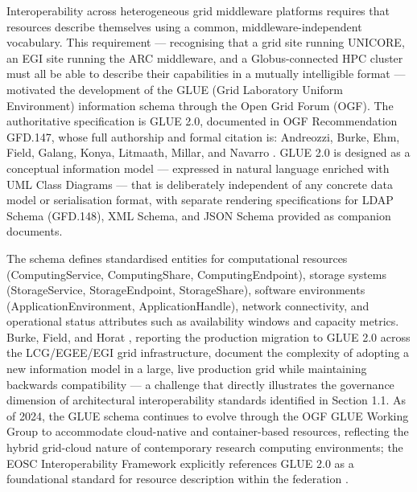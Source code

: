 \documentclass[12pt,a4paper]{report}
\begin{document}
Interoperability across heterogeneous grid middleware platforms requires that resources describe themselves using a common, middleware-independent 
vocabulary. This requirement — recognising that a grid site running UNICORE, an EGI site running the ARC middleware, and a Globus-connected HPC
 cluster must all be able to describe their capabilities in a mutually intelligible format — motivated the development of the GLUE
  (Grid Laboratory Uniform Environment) information schema through the Open Grid Forum (OGF). The authoritative specification is GLUE 2.0, 
  documented in OGF Recommendation GFD.147, whose full authorship and formal citation is: Andreozzi, Burke, Ehm, Field, Galang, Konya, Litmaath,
   Millar, and Navarro \parencite{andreozzi2009glue}. GLUE 2.0 is designed as a conceptual information model — expressed in natural language enriched with UML Class 
   Diagrams — that is deliberately independent of any concrete data model or serialisation format, with separate rendering specifications for
    LDAP Schema (GFD.148), XML Schema, and JSON Schema \parencite{memon2016glue} provided as companion documents. 
    
    The schema defines
     standardised entities for computational resources (ComputingService, ComputingShare, ComputingEndpoint), storage systems 
     (StorageService, StorageEndpoint, StorageShare), software environments (ApplicationEnvironment, ApplicationHandle), network connectivity,
      and operational status attributes such as availability windows and capacity metrics. Burke, Field, and Horat \parencite{burke2011}, 
      reporting the production 
      migration to GLUE 2.0 across the LCG/EGEE/EGI grid infrastructure, document the complexity of adopting a new information model in a large, 
      live production grid while maintaining backwards compatibility — a challenge that directly illustrates the governance dimension of architectural 
      interoperability standards identified in Section 1.1. As of 2024, the GLUE schema continues to evolve through the OGF GLUE Working Group 
      to accommodate cloud-native and container-based resources, reflecting the hybrid grid-cloud nature of contemporary research computing environments;
       the EOSC Interoperability Framework explicitly references GLUE 2.0 as a foundational standard for resource description within the federation \parencite{eosc2022}.
\end{document}

